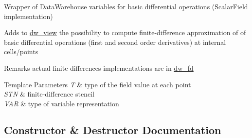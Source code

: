 Wrapper of Data\+Warehouse variables for basic differential operations (\hyperlink{structUintah_1_1PhaseField_1_1ScalarField}{Scalar\+Field} implementation) 

Adds to \hyperlink{classUintah_1_1PhaseField_1_1detail_1_1dw__view}{dw\+\_\+view} the possibility to compute finite-\/difference approximation of of basic differential operations (first and second order derivatives) at internal cells/points

\begin{DoxyRemark}{Remarks}
actual finite-\/differences implementations are in \hyperlink{classUintah_1_1PhaseField_1_1detail_1_1dw__fd}{dw\+\_\+fd}
\end{DoxyRemark}

\begin{DoxyTemplParams}{Template Parameters}
{\em T} & type of the field value at each point \\
\hline
{\em S\+TN} & finite-\/difference stencil \\
\hline
{\em V\+AR} & type of variable representation \\
\hline
\end{DoxyTemplParams}


\subsection{Constructor \& Destructor Documentation}
\mbox{\label{classUintah_1_1PhaseField_1_1detail_1_1dw__basic__fd__view_3_01ScalarField_3_01T_01_4_00_01STN_00_01VAR_01_4_a24526a2c0daca0cb39b13a1b61fcda83}} 
